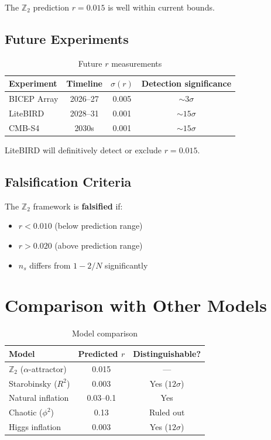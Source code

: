 \documentclass[12pt,a4paper]{article}
\begin{document}
The $\mathbb{Z}_2$ prediction $r = 0.015$ is well within current bounds.

\subsection{Future Experiments}

\begin{table}[h]
\centering
\begin{tabular}{lccc}
\toprule
Experiment & Timeline & $\sigma(r)$ & Detection significance \\
\midrule
BICEP Array & 2026--27 & 0.005 & $\sim 3\sigma$ \\
LiteBIRD & 2028--31 & 0.001 & $\sim 15\sigma$ \\
CMB-S4 & 2030s & 0.001 & $\sim 15\sigma$ \\
\bottomrule
\end{tabular}
\caption{Future $r$ measurements}
\end{table}

LiteBIRD will definitively detect or exclude $r = 0.015$.

\subsection{Falsification Criteria}

The $\mathbb{Z}_2$ framework is \textbf{falsified} if:
\begin{itemize}
    \item $r < 0.010$ (below prediction range)
    \item $r > 0.020$ (above prediction range)
    \item $n_s$ differs from $1 - 2/N$ significantly
\end{itemize}

\section{Comparison with Other Models}

\begin{table}[h]
\centering
\begin{tabular}{lcc}
\toprule
Model & Predicted $r$ & Distinguishable? \\
\midrule
$\mathbb{Z}_2$ ($\alpha$-attractor) & 0.015 & --- \\
Starobinsky ($R^2$) & 0.003 & Yes ($12\sigma$) \\
Natural inflation & 0.03--0.1 & Yes \\
Chaotic ($\phi^2$) & 0.13 & Ruled out \\
Higgs inflation & 0.003 & Yes ($12\sigma$) \\
\bottomrule
\end{tabular}
\caption{Model comparison}
\end{table}
\end{document}
